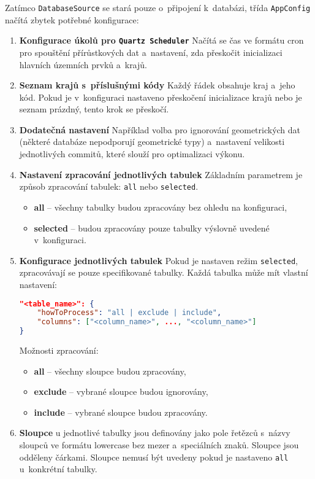 Zatímco \texttt{DatabaseSource} se stará pouze o~připojení k~databázi,  
třída \texttt{AppConfig} načítá zbytek potřebné konfigurace:
\begin{enumerate}
    \item \textbf{Konfigurace úkolů pro \texttt{Quartz Scheduler}}  
    Načítá se čas ve formátu cron pro spouštění přírůstkových dat  
    a~nastavení, zda přeskočit inicializaci hlavních územních prvků a~krajů.
    \item \textbf{Seznam krajů s~příslušnými kódy}  
    Každý řádek obsahuje kraj a~jeho kód.  
    Pokud je v~konfiguraci nastaveno přeskočení inicializace krajů nebo je seznam prázdný, tento krok se přeskočí.
    \item \textbf{Dodatečná nastavení}  
    Například volba pro ignorování geometrických dat  
    (některé databáze nepodporují geometrické typy)  
    a~nastavení velikosti jednotlivých commitů, které slouží pro optimalizaci výkonu.
    \item \textbf{Nastavení zpracování jednotlivých tabulek}  
    Základním parametrem je způsob zpracování tabulek: \texttt{all} nebo \texttt{selected}.  
    \begin{itemize}
        \item \textbf{all} -- všechny tabulky budou zpracovány bez ohledu na konfiguraci,
        \item \textbf{selected} -- budou zpracovány pouze tabulky výslovně uvedené v~konfiguraci.
    \end{itemize}
    \item \textbf{Konfigurace jednotlivých tabulek}  
    Pokud je nastaven režim \texttt{selected}, zpracovávají se pouze specifikované tabulky.  
    Každá tabulka může mít vlastní nastavení:
    \begin{lstlisting}[language=json, caption=Konfigurace tabulek, label=lst:konfTabulek]
"<table_name>": {
    "howToProcess": "all | exclude | include",
    "columns": ["<column_name>", ..., "<column_name>"]
}
    \end{lstlisting}
    
    Možnosti zpracování:
    \begin{itemize}
        \item \textbf{all} -- všechny sloupce budou zpracovány,
        \item \textbf{exclude} -- vybrané sloupce budou ignorovány,
        \item \textbf{include} -- vybrané sloupce budou zpracovány.
    \end{itemize}

    \item \textbf{Sloupce} u jednotlivé tabulky jsou definovány jako pole řetězců s~názvy sloupců 
    ve formátu lowercase bez mezer a~speciálních znaků. Sloupce jsou odděleny čárkami.
    Sloupce nemusí být uvedeny pokud je nastaveno \texttt{all} u~konkrétní tabulky.
\end{enumerate}


